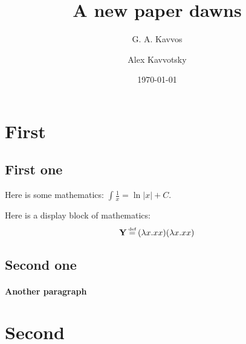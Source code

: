 \documentclass{scrartcl}
\title{A new paper dawns}
\author{G. A. Kavvos \and Alex Kavvotsky}
\date{\today}
\begin{document}
\maketitle

\begin{abstract}
  \lipsum[1]
\end{abstract}


\section{First}

\subsection{First one}
  Here is some mathematics: \( \int \frac{1}{x} = \ln |x| + C \).
  
  Here is a display block of mathematics:
  \[
    \mathbf{Y} \defeq (\lambda x. xx)(\lambda x. xx)
  \]

  \lipsum[1] \parencite{qian2021}

\subsection{Second one}
  \lipsum[2]
  
  \paragraph{Another paragraph}
  \lipsum[3]
  
\section{Second}

\lipsum[4]

\printbibliography
\end{document}
